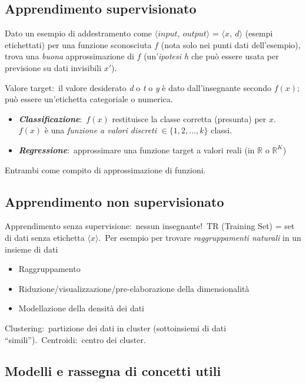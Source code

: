 \subsection{Apprendimento supervisionato}

Dato un esempio di addestramento come $\langle input,\ output \rangle$ = $\langle x,\ d \rangle$ (esempi etichettati)
per una funzione sconosciuta $f$ (nota solo nei punti dati dell'esempio), trova una \textit{buona} approssimazione di $f$ (un'\textit{ipotesi h} che può essere usata per
previsione su dati invisibili $x'$).

\noindent Valore target:\ il valore desiderato \textit{d} o \textit{t} o \textit{y} è dato dall'insegnante secondo $f(x)$; può essere un'etichetta categoriale o numerica.
\begin{itemize}
	\item\textbf{\textit{Classificazione}}:\ $f(x)$ restituisce la classe corretta (presunta) per $x$.\ $f(x)$ è una \textit{funzione a valori discreti} $\in \{1,2,\dots, k\}$ classi.
	\item \textbf{\textit{Regressione}}:\ approssimare una funzione target a valori reali (in $\mathbb{R}$ o $\mathbb{R}^K$)
\end{itemize}

\noindent Entrambi come compito di approssimazione di funzioni.

\subsection{Apprendimento non supervisionato}

Apprendimento senza supervisione:\ nessun insegnante!\
TR (Training Set) = set di dati senza etichetta $\langle x \rangle$.\
Per esempio per trovare \textit{raggruppamenti naturali} in un insieme di dati
\begin{itemize}
	\item Raggruppamento
	\item Riduzione/visualizzazione/pre-elaborazione della dimensionalità
	\item Modellazione della densità dei dati
\end{itemize}

\noindent Clustering:\ partizione dei dati in cluster (sottoinsiemi di dati ``simili'').\ Centroidi:\ centro dei cluster.

\subsection{Modelli e rassegna di concetti utili}

